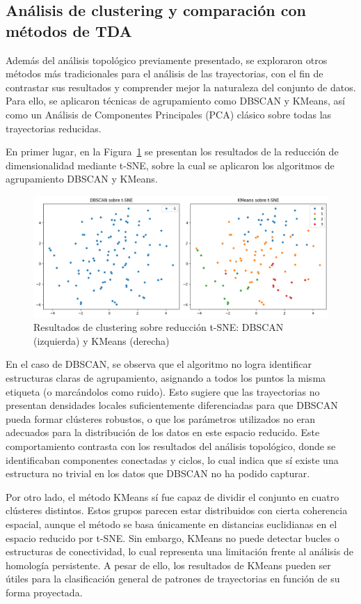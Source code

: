 \subsection{Análisis de clustering y comparación con métodos de TDA}

Además del análisis topológico previamente presentado, se exploraron otros métodos más tradicionales para el análisis de las trayectorias, con el fin de contrastar sus resultados y comprender mejor la naturaleza del conjunto de datos. Para ello, se aplicaron técnicas de agrupamiento como DBSCAN y KMeans, así como un Análisis de Componentes Principales (PCA) clásico sobre todas las trayectorias reducidas. 

En primer lugar, en la Figura~\ref{fig:tsne_cluster} se presentan los resultados de la reducción de dimensionalidad mediante t-SNE, sobre la cual se aplicaron los algoritmos de agrupamiento DBSCAN y KMeans.

\begin{figure}[htbp]
    \centering
    \includegraphics[width=\linewidth]{images/dbscan_kmeans.png}
    \caption{Resultados de clustering sobre reducción t-SNE: DBSCAN (izquierda) y KMeans (derecha)}
    \label{fig:tsne_cluster}
\end{figure}

En el caso de DBSCAN, se observa que el algoritmo no logra identificar estructuras claras de agrupamiento, asignando a todos los puntos la misma etiqueta (o marcándolos como ruido). Esto sugiere que las trayectorias no presentan densidades locales suficientemente diferenciadas para que DBSCAN pueda formar clústeres robustos, o que los parámetros utilizados no eran adecuados para la distribución de los datos en este espacio reducido. Este comportamiento contrasta con los resultados del análisis topológico, donde se identificaban componentes conectadas y ciclos, lo cual indica que sí existe una estructura no trivial en los datos que DBSCAN no ha podido capturar.

Por otro lado, el método KMeans sí fue capaz de dividir el conjunto en cuatro clústeres distintos. Estos grupos parecen estar distribuidos con cierta coherencia espacial, aunque el método se basa únicamente en distancias euclidianas en el espacio reducido por t-SNE. Sin embargo, KMeans no puede detectar bucles o estructuras de conectividad, lo cual representa una limitación frente al análisis de homología persistente. A pesar de ello, los resultados de KMeans pueden ser útiles para la clasificación general de patrones de trayectorias en función de su forma proyectada.

